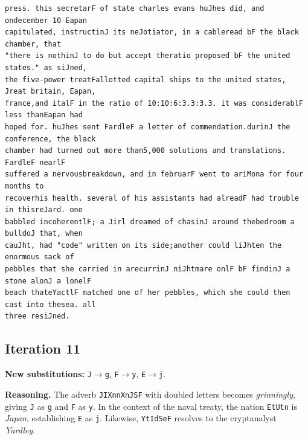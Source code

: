 \documentclass[11pt,a4paper]{article}
\begin{document}
\begin{lstlisting}[style=ciphertext,caption={Complete text after iteration 10}]
press. this secretarF of state charles evans huJhes did, and ondecember 10 Eapan
capitulated, instructinJ its neJotiator, in a cableread bF the black chamber, that
"there is nothinJ to do but accept theratio proposed bF the united states." as siJned,
the five-power treatFallotted capital ships to the united states, Jreat britain, Eapan,
france,and italF in the ratio of 10:10:6:3.3:3.3. it was considerablF less thanEapan had
hoped for. huJhes sent FardleF a letter of commendation.durinJ the conference, the black
chamber had turned out more than5,000 solutions and translations. FardleF nearlF
suffered a nervousbreakdown, and in februarF went to ariMona for four months to
recoverhis health. several of his assistants had alreadF had trouble in thisreJard. one
babbled incoherentlF; a Jirl dreamed of chasinJ around thebedroom a bulldoJ that, when
cauJht, had "code" written on its side;another could liJhten the enormous sack of
pebbles that she carried in arecurrinJ niJhtmare onlF bF findinJ a stone alonJ a lonelF
beach thateYactlF matched one of her pebbles, which she could then cast into thesea. all
three resiJned.
\end{lstlisting}

\newpage
\subsection{Iteration 11}

\noindent\textbf{New substitutions:} \texttt{J}$\rightarrow$\texttt{g}, \texttt{F}$\rightarrow$\texttt{y}, \texttt{E}$\rightarrow$\texttt{j}.\par
\smallskip
\noindent\textbf{Reasoning.} The adverb \texttt{JIXnnXnJSF} with doubled letters becomes \textit{grinningly}, giving \texttt{J} as \texttt{g} and \texttt{F} as \texttt{y}. In the context of the naval treaty, the nation \texttt{EtUtn} is \textit{Japan}, establishing \texttt{E} as \texttt{j}. Likewise, \texttt{YtIdSeF} resolves to the cryptanalyst \textit{Yardley}.
\end{document}
